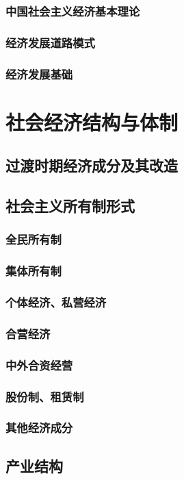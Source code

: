 \documentclass[UTF8]{../../RepresentationUniverse}
\begin{document}
    \subsubsection{中国社会主义经济基本理论}
    \subsubsection{经济发展道路模式}
    \subsubsection{经济发展基础}
\section{社会经济结构与体制}
    \subsection{过渡时期经济成分及其改造}
    \subsection{社会主义所有制形式}
        \subsubsection{全民所有制}
        \subsubsection{集体所有制}
        \subsubsection{个体经济、私营经济}
        \subsubsection{合营经济}
        \subsubsection{中外合资经营}
        \subsubsection{股份制、租赁制}
        \subsubsection{其他经济成分}
    \subsection{产业结构}
\end{document}
